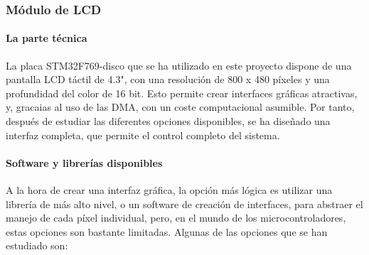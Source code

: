 \subsubsection{Módulo de LCD}
\paragraph{La parte técnica}
La placa STM32F769-disco que se ha utilizado en este proyecto dispone de una pantalla LCD táctil de 4.3", con una resolución de 800 x 480 píxeles y una profundidad del color de 16 bit. Esto permite crear interfaces gráficas atractivas, y, gracaias al uso de las DMA, con un coste computacional asumible. Por tanto, después de estudiar las diferentes opciones disponibles, se ha diseñado una interfaz completa, que permite el control completo del sistema.
\paragraph{Software y librerías disponibles}
A la hora de crear una interfaz gráfica, la opción más lógica es utilizar una librería de más alto nivel, o un software de creación de interfaces, para abstraer el manejo de cada píxel individual, pero, en el mundo de los microcontroladores, estas opciones son bastante limitadas. Algunas de las opciones que se han estudiado son:

